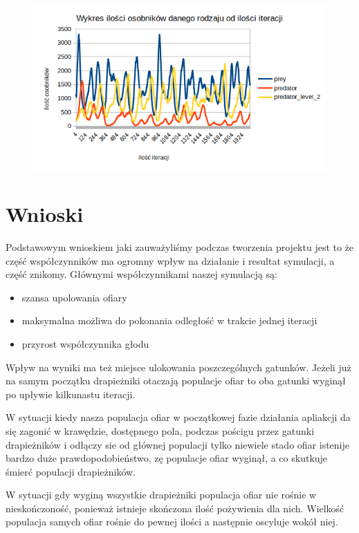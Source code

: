 \begin{figure}[H]
	\centering
	\includegraphics[width=1.1\linewidth]{img/ok5}
	\caption{\label{fig:screen} }
\end{figure}

\section{Wnioski}

Podstawowym wnioskiem jaki zauważyliśmy podczas tworzenia projektu jest to że część współczynników ma ogromny wpływ na działanie i resultat symulacji, a część znikomy. Głównymi współczynnikami naszej symulacją są:
\begin{itemize}
	\item szansa upolowania ofiary
	\item maksymalna możliwa do pokonania odległość w trakcie jednej iteracji
	\item przyrost współczynnika głodu 
\end{itemize}
 Wpływ na wyniki ma też miejsce ulokowania poszczególnych gatunków. Jeżeli już na samym początku drapieżniki otaczają populacje ofiar to  oba gatunki wyginął po upływie kilkunastu iteracji.  

W sytuacji kiedy nasza populacja ofiar w początkowej fazie działania apliakcji da się zagonić w krawędzie, dostępnego pola, podczas pościgu przez gatunki drapieżników i odłączy sie od głównej populacji tylko niewiele stado ofiar istenije bardzo duże prawdopodobieństwo, zę populacje ofiar wyginął, a co skutkuje śmierć populacji drapieżników.

W sytuacji gdy wyginą wszystkie drapieżniki populacja ofiar nie rośnie w nieskończoność, ponieważ istnieje skończona ilość pożywienia dla nich. Wielkość populacja samych ofiar rośnie do pewnej ilości a następnie oscyluje wokół niej. 


